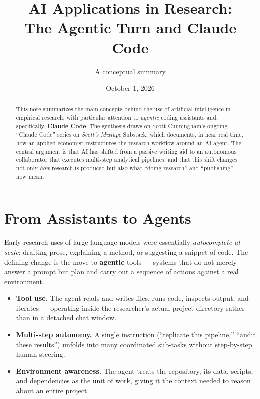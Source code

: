 \documentclass[11pt]{article}
\title{\textbf{AI Applications in Research:\\ The Agentic Turn and Claude Code}}
\author{A conceptual summary}
\date{October 1, 2026}
\begin{document}
\maketitle

\begin{abstract}
\noindent This note summarizes the main concepts behind the use of artificial
intelligence in empirical research, with particular attention to
\emph{agentic} coding assistants and, specifically, \textbf{Claude Code}. The
synthesis draws on Scott Cunningham's ongoing ``Claude Code'' series on
\emph{Scott's Mixtape} Substack, which documents, in near real time, how an
applied economist restructures the research workflow around an AI agent. The
central argument is that AI has shifted from a passive writing aid to an
autonomous collaborator that executes multi-step analytical pipelines, and
that this shift changes not only \emph{how} research is produced but also what
``doing research'' and ``publishing'' now mean.
\end{abstract}

\tableofcontents
\vspace{1em}

\section{From Assistants to Agents}

Early research uses of large language models were essentially \emph{autocomplete
at scale}: drafting prose, explaining a method, or suggesting a snippet of code.
The defining change is the move to \textbf{agentic} tools --- systems that do not
merely answer a prompt but plan and carry out a sequence of actions against a
real environment.

\begin{itemize}
  \item \textbf{Tool use.} The agent reads and writes files, runs code, inspects
        output, and iterates --- operating inside the researcher's actual
        project directory rather than in a detached chat window.
  \item \textbf{Multi-step autonomy.} A single instruction (``replicate this
        pipeline,'' ``audit these results'') unfolds into many coordinated
        sub-tasks without step-by-step human steering.
  \item \textbf{Environment awareness.} The agent treats the repository, its
        data, scripts, and dependencies as the unit of work, giving it the
        context needed to reason about an entire project.
\end{itemize}
\end{document}
